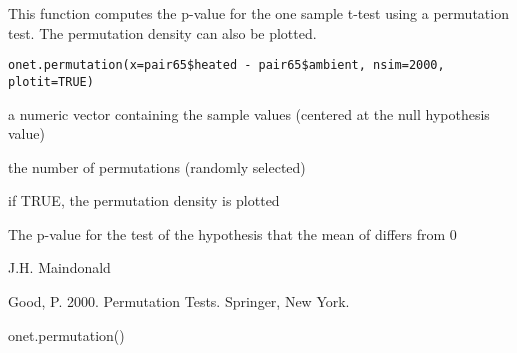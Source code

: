 \begin{Description}\relax
This function computes the p-value for the one sample
t-test using a permutation test.  The permutation
density can  also be plotted.
\end{Description}
\begin{Usage}
\begin{verbatim}
onet.permutation(x=pair65$heated - pair65$ambient, nsim=2000, plotit=TRUE)
\end{verbatim}
\end{Usage}
\begin{Arguments}
\begin{ldescription}
\item[\code{x}] a numeric vector containing the sample values (centered
at the null hypothesis value) 
\item[\code{nsim}] the number of permutations (randomly selected)
\item[\code{plotit}] if TRUE, the permutation density is plotted 
\end{ldescription}
\end{Arguments}
\begin{Value}
The p-value for the test of the hypothesis that the mean of 
differs from 0
\end{Value}
\begin{Author}\relax
J.H. Maindonald
\end{Author}
\begin{References}\relax
Good, P. 2000. Permutation Tests. Springer, New York.
\end{References}
\begin{Examples}
\begin{ExampleCode}
onet.permutation()
\end{ExampleCode}
\end{Examples}

